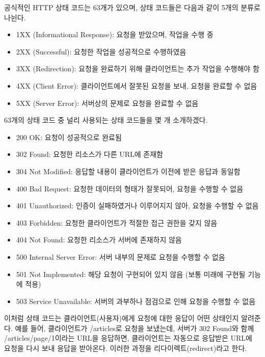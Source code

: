 공식적인 HTTP 상태 코드는 63개가 있으며, 상태 코드들은 다음과 같이 5개의 분류로 나뉜다.

\begin{itemize}
    \item 1XX (Informational Response): 요청을 받았으며, 작업을 수행 중
    \item 2XX (Successful): 요청한 작업을 성공적으로 수행하였음
    \item 3XX (Redirection): 요청을 완료하기 위해 클라이언트는 추가 작업을 수행해야 함
    \item 4XX (Client Error): 클라이언트에서 잘못된 요청을 보내, 요청을 완료할 수 없음
    \item 5XX (Server Error): 서버상의 문제로 요청을 완료할 수 없음
\end{itemize}

63개의 상태 코드 중 널리 사용되는 상태 코드들을 몇 개 소개하겠다.

\begin{itemize}
    \item 200 OK: 요청이 성공적으로 완료됨
    \item 302 Found: 요청한 리소스가 다른 URL에 존재함
    \item 304 Not Modified: 응답할 내용이 클라이언트가 이전에 받은 응답과 동일함
    \item 400 Bad Request: 요청한 데이터의 형태가 잘못되어, 요청을 수행할 수 없음
    \item 401 Unauthorized: 인증이 실패하였거나 이루어지지 않아, 요청을 수행할 수 없음
    \item 403 Forbidden: 요청한 클라이언트가 적절한 접근 권한을 갖지 않음
    \item 404 Not Found: 요청한 리소스가 서버에 존재하지 않음
    \item 500 Internal Server Error: 서버 내부의 문제로 요청을 수행할 수 없음
    \item 501 Not Implemented: 해당 요청이 구현되어 있지 않음 (보통 미래에 구현될 기능에 적용)
    \item 503 Service Unavailable: 서버의 과부하나 점검으로 인해 요청을 수행할 수 없음
\end{itemize}

이처럼 상태 코드는 클라이언트(사용자)에게 요청에 대한 응답이 어떤 상태인지 알려준다. 예를 들어, 클라이언트가 /articles로 요청을 보냈는데, 서버가 302 Found와 함께 /articles/page/1이라는 URL을 응답하면, 클라이언트는 자동으로 응답받은 URL에 요청을 다시 보내 응답을 받아온다. 이러한 과정을 리다이렉트(redirect)라고 한다.
